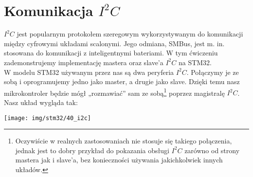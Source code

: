% 
% 
% 
% 

\section{Komunikacja $I^2C$}
$I^2C$ jest popularnym protokołem szeregowym wykorzystywanym do komunikacji między cyfrowymi układami scalonymi. Jego odmiana, SMBus, jest m. in.
stosowana do komunikacji z inteligentnymi bateriami. W tym ćwiczeniu zademonstrujemy implementację mastera oraz slave'a $I^2C$ na STM32.\\

W modelu STM32 używanym przez nas są dwa peryferia $I^2C$. Połączymy je ze sobą i oprogramujemy jedno jako master, a drugie jako slave.
Dzięki temu nasz mikrokontroler będzie mógł „rozmawiać” sam ze sobą\footnote{
	Oczywiście w realnych zastosowaniach nie stosuje się takiego połączenia, jednak jest to dobry przykład do pokazania obsługi $I^2C$
	zarówno od strony mastera jak i slave'a, bez konieczności używania jakichkolwiek innych układów.
} poprzez magistralę $I^2C$.
Nasz układ wygląda tak:

\begin{center}\texttt{[image: img/stm32/40\_i2c]}\end{center}

